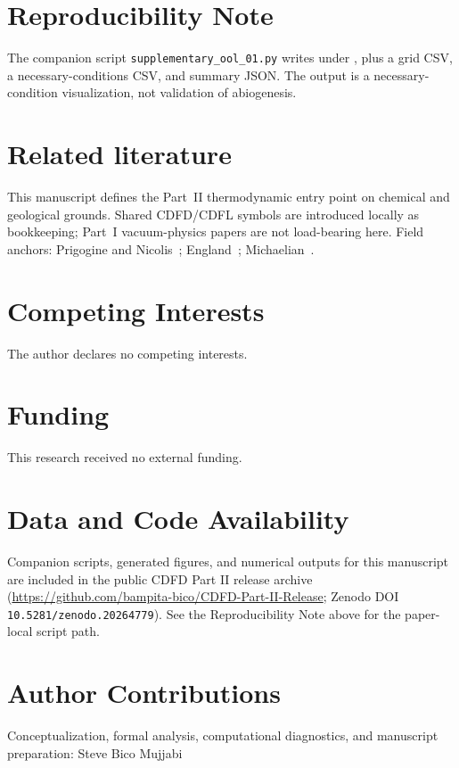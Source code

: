 \documentclass[11pt,a4paper]{article}
\begin{document}
\section{Reproducibility Note}
The companion script \texttt{supplementary\_ool\_01.py} writes
 under , plus a grid
CSV, a necessary-conditions CSV, and summary JSON. The output is a
necessary-condition visualization, not validation of abiogenesis.

\section*{Related literature}
This manuscript defines the Part~II thermodynamic entry point on chemical and geological grounds. Shared CDFD/CDFL symbols are introduced locally as bookkeeping; Part~I vacuum-physics papers are not load-bearing here. Field anchors: Prigogine and Nicolis~\cite{PrigogineNicolis1977}; England~\cite{England2013}; Michaelian~\cite{Michaelian2011,Michaelian2017}.

\section*{Competing Interests}
The author declares no competing interests.

\section*{Funding}
This research received no external funding.

\section*{Data and Code Availability}
Companion scripts, generated figures, and numerical outputs for this manuscript are included in the public CDFD Part II release archive (\url{https://github.com/bampita-bico/CDFD-Part-II-Release}; Zenodo DOI \texttt{10.5281/zenodo.20264779}). See the Reproducibility Note above for the paper-local script path.

\section*{Author Contributions}
Conceptualization, formal analysis, computational diagnostics, and manuscript preparation: Steve Bico Mujjabi



\end{document}
